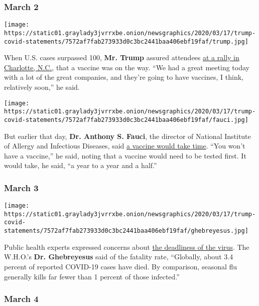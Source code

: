 \hypertarget{march-2}{%
\subsubsection{March 2}\label{march-2}}

\texttt{[image: https://static01.graylady3jvrrxbe.onion/newsgraphics/2020/03/17/trump-covid-statements/7572af7fab273933d0c3bc2441baa406ebf19faf/trump.jpg]}

When U.S. cases surpassed 100, \textbf{Mr. Trump} assured attendees
\href{https://www.c-span.org/video/?469845-1/president-trump-campaigns-charlotte-north-carolina\&live\&start=685}{at
a rally in Charlotte, N.C.}, that a vaccine was on the way. ``We had a
great meeting today with a lot of the great companies, and they're going
to have vaccines, I think, relatively soon,'' he said.

\texttt{[image: https://static01.graylady3jvrrxbe.onion/newsgraphics/2020/03/17/trump-covid-statements/7572af7fab273933d0c3bc2441baa406ebf19faf/fauci.jpg]}

But earlier that day, \textbf{Dr. Anthony S. Fauci}, the director of
National Institute of Allergy and Infectious Diseases, said
\href{https://www.whitehouse.gov/briefings-statements/remarks-president-trump-members-coronavirus-task-force-meeting-pharmaceutical-companies/}{a
vaccine would take time}. ``You won't have a vaccine,'' he said, noting
that a vaccine would need to be tested first. It would take, he said,
``a year to a year and a half.''

\hypertarget{march-3}{%
\subsubsection{March 3}\label{march-3}}

\texttt{[image: https://static01.graylady3jvrrxbe.onion/newsgraphics/2020/03/17/trump-covid-statements/7572af7fab273933d0c3bc2441baa406ebf19faf/ghebreyesus.jpg]}

Public health experts expressed concerns about
\href{https://www.who.int/dg/speeches/detail/who-director-general-s-opening-remarks-at-the-media-briefing-on-covid-19---3-march-2020}{the
deadliness of the virus}. The W.H.O.'s \textbf{Dr. Ghebreyesus} said of
the fatality rate, ``Globally, about 3.4 percent of reported COVID-19
cases have died. By comparison, seasonal flu generally kills far fewer
than 1 percent of those infected.''

\hypertarget{march-4}{%
\subsubsection{March 4}\label{march-4}}

